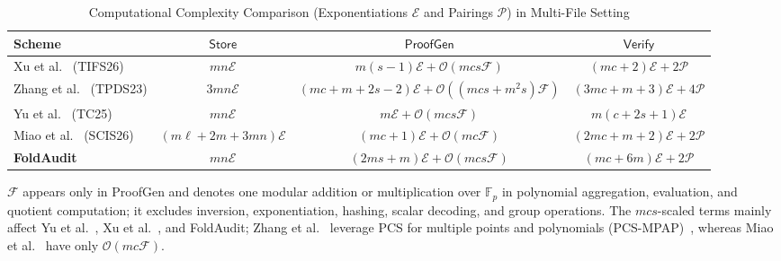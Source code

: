 \documentclass[lettersize,journal]{IEEEtran}
\newcommand{\FF}{\mathbb{F}}
\newcommand{\CompExp}{\mathcal{E}}
\newcommand{\CompPair}{\mathcal{P}}
\newcommand{\CompField}{\mathcal{F}}
\newcommand{\Store}{\mathsf{Store}}
\newcommand{\ProofGen}{\mathsf{ProofGen}}
\newcommand{\Verify}{\mathsf{Verify}}
\begin{document}
\begin{table}[!t]
\centering
\caption{Computational Complexity Comparison (Exponentiations $\CompExp$ and Pairings $\CompPair$) in Multi-File Setting}
\label{tab:computation}
\renewcommand{\arraystretch}{1.3}
\begin{tabular}{l|c|c|c}
\hline
\textbf{Scheme} & \textbf{$\Store$} & \textbf{$\ProofGen$} & \textbf{$\Verify$} \\
\hline
Xu et al.~\cite{XuTIFS26} (TIFS26) & $mn\CompExp$ & $m(s-1)\CompExp+\mathcal{O}(mcs\CompField)$ & $(mc+2)\CompExp+2\CompPair$ \\
Zhang et al.~\cite{ZhangTPDS23} (TPDS23) & $3mn\CompExp$& $(mc+m+2s-2)\CompExp+\mathcal{O}((mcs+m^2s)\CompField)$& $(3mc+m+3)\CompExp+4\CompPair$\\
Yu et al.~\cite{YuTC25} (TC25) & $mn\CompExp$ & $m\CompExp+\mathcal{O}(mcs\CompField)$ & $m(c+2s+1)\CompExp$\\
Miao et al.~\cite{MiaoSCIS2026} (SCIS26) &  $(m\ell+2m+3mn)\CompExp$ & $(mc+1)\CompExp+\mathcal{O}(mc\CompField)$ & $(2mc+m+2)\CompExp+2\CompPair$\\
\hline
\textbf{FoldAudit} & $mn\CompExp$ & $(2ms+m)\CompExp+\mathcal{O}(mcs\CompField)$ & $(mc+6m)\CompExp+2\CompPair$ \\
\hline
\end{tabular}
\vspace{1mm}
\footnotesize
\begin{minipage}{0.96\textwidth}
\(\CompField\) appears only in \textsf{ProofGen} and denotes one modular addition or multiplication over \(\FF_p\) in polynomial aggregation, evaluation, and quotient computation; it excludes inversion, exponentiation, hashing, scalar decoding, and group operations. The \(mcs\)-scaled terms mainly affect Yu et al.~\cite{YuTC25}, Xu et al.~\cite{XuTIFS26}, and FoldAudit; Zhang et al.~\cite{ZhangTPDS23} leverage PCS for multiple points and polynomials (PCS-MPAP)~\cite{Boneh2020PCS}, whereas Miao et al.~\cite{MiaoSCIS2026} have only \(\mathcal{O}(mc\CompField)\).
\end{minipage}
\end{table}
\end{document}
